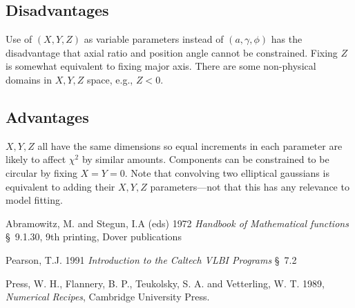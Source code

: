 \documentclass[11pt]{article}
\begin{document}
\subsection{Disadvantages}

Use of $(X,Y,Z)$ as variable parameters instead of $(a,\gamma,\phi)$
has the disadvantage that axial ratio and position angle cannot be
constrained. Fixing $Z$ is somewhat equivalent to fixing major
axis. There are some non-physical domains in $X,Y,Z$ space, e.g.,
$Z<0$.

\subsection{Advantages}

$X,Y,Z$ all have the same dimensions so equal increments in each parameter
are likely to affect $\chi^2$ by similar amounts. Components can be
constrained to be circular by fixing $X=Y=0$. Note that convolving two
elliptical gaussians is equivalent to adding their $X,Y,Z$ parameters---not
that this has any relevance to model fitting.


\begin{thebibliography}{xx}
 Abramowitz, M. and Stegun, I.A (eds) 1972 {\em
Handbook of Mathematical functions} \S~9.1.30, 9th printing, Dover publications

 Pearson, T.J. 1991 {\em Introduction to the Caltech VLBI
Programs} \S~7.2

 Press, W. H., Flannery, B. P., Teukolsky, S. A. and
Vetterling, W. T. 1989, {\em Numerical Recipes}, Cambridge University
Press.
\end{thebibliography}
\end{document}
